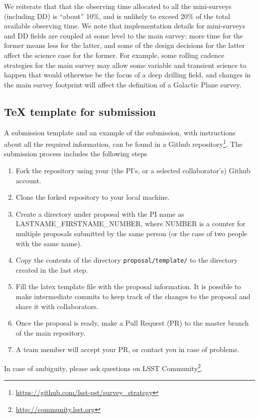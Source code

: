 \documentclass[DM,lsstdraft,toc,usenatbib]{lsstdoc}
\begin{document}
We reiterate that that the observing time allocated to all the mini-surveys 
(including DD) is ``about'' 10\%, and is unlikely to exceed 20\% of the total available
observing time. We note that implementation details for mini-surveys and DD fields 
are coupled at some level to the main survey: more time for the former means less 
for the latter, and some of the design decisions for the latter affect the science
case for the former.  For example, some rolling cadence strategies for the main survey  
may allow some variable and transient science to happen that would otherwise be the 
focus of a deep drilling field, and changes in the main survey footprint will affect the 
definition of a Galactic Plane survey. 


\subsection{TeX template for submission} 

A submission template and an example of the submission, with instructions about
all the required information, can be found in a Github repository\footnote{\url{https://github.com/lsst-pst/survey_strategy}}. 
The submission process includes the following steps
%
\begin{enumerate}
\item Fork the repository using your (the PI's, or a selected collaborator's)  Github account.
\item Clone the forked repository to your local machine.
\item Create a directory under proposal with the PI name as LASTNAME\_FIRSTNAME\_NUMBER,
where NUMBER is a counter for multiple proposals submitted by the same person (or the case
of two people with the same name). 
\item Copy the contents of the directory \texttt{proposal/template/} to the directory created in the last step.
\item Fill the latex template file with the proposal information. It is possible to make intermediate 
          commits to keep track of the changes to the proposal and share it with collaborators.
\item Once the proposal is ready, make a Pull Request (PR) to the master branch of the main repository. 
\item A team member will accept your PR, or contact you in case of problems. 
\end{enumerate}

In case of ambiguity, please ask questions on LSST Community\footnote{\url{http://community.lsst.org}}. 
\end{document}
